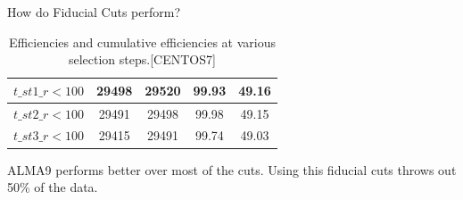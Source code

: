 \begin{frame}{How do Fiducial Cuts perform?}
\begin{table}[h!]
\begin{tabular}{|l|c|c|c|c|}
        $t\_st1\_r < 100$        & 29498        & 29520       & 99.93                   & 49.16                              \\ \hline
        $t\_st2\_r < 100$        & 29491        & 29498       & 99.98                   & 49.15                              \\ \hline
        $t\_st3\_r < 100$        & 29415        & 29491       & 99.74                   & 49.03                              \\ \hline
        \end{tabular}
        \caption{Efficiencies and cumulative efficiencies at various selection steps.[CENTOS7]}
        \label{table:efficiency_updated}
        \end{table}        
        \vspace{-0.5cm}
        ALMA9 performs better over most of the cuts. Using this fiducial cuts throws out 50\% of the data.
\end{frame}

